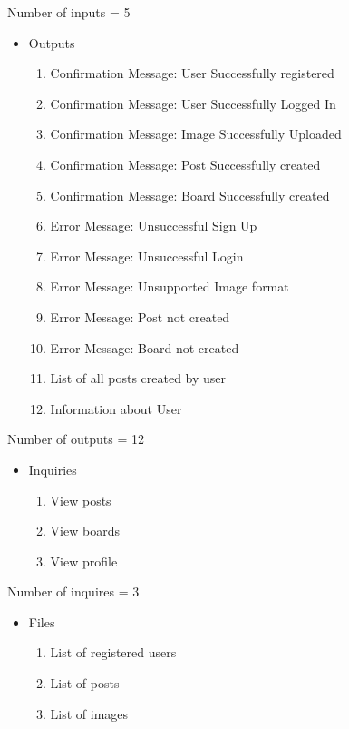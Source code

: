 \documentclass[12pt]{report}
\begin{document}
Number of inputs = 5

\begin{itemize}
    \item Outputs
    \begin{enumerate}
        \item Confirmation Message: User Successfully registered
        \item Confirmation Message: User Successfully Logged In
        \item Confirmation Message: Image Successfully Uploaded
        \item Confirmation Message: Post Successfully created
        \item Confirmation Message: Board Successfully created
        \item Error Message: Unsuccessful Sign Up
        \item Error Message: Unsuccessful Login
        \item Error Message: Unsupported Image format
        \item Error Message: Post not created
        \item Error Message: Board not created
        \item List of all posts created by user
        \item Information about User
    \end{enumerate}
\end{itemize}


Number of outputs = 12

\begin{itemize}
    \item Inquiries
    \begin{enumerate}
        \item View posts
        \item View boards
        \item View profile
    \end{enumerate}
\end{itemize}

Number of inquires = 3

\begin{itemize}
    \item Files
    \begin{enumerate}
        \item List of registered users
        \item List of posts
        \item List of images
    \end{enumerate}
\end{itemize}
\end{document}

